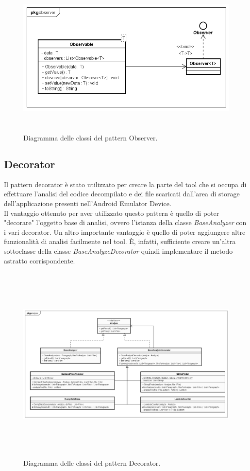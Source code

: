 \begin{figure}[H]
    \centering
    \includegraphics[width=14cm, height=8cm]{./immagini/diagrammi_uml/Observer.png}
    \caption{Diagramma delle classi del pattern Observer.}\label{fig:observer}
\end{figure}

\newpage
\subsection{Decorator}\label{subsec:decorator}
Il pattern decorator\cite{womak:decorator} è stato utilizzato per creare la parte del tool che si occupa
di effettuare l'analisi del codice decompilato e dei file scaricati dall'area di storage
dell'applicazione presenti nell'Android Emulator Device.\\
Il vantaggio ottenuto per aver utilizzato questo pattern è quello di poter "decorare" l'oggetto base di analisi, ovvero l'istanza della classe \textit{BaseAnalyzer} con i vari decorator.
Un altro importante vantaggio è quello di poter aggiungere altre funzionalità
di analisi facilmente nel tool.
È, infatti, sufficiente creare un'altra sottoclasse della classe \textit{BaseAnalyzeDecorator} quindi implementare il metodo astratto corrispondente.

\begin{figure}[H]
    \centering
    \includegraphics[width=14cm, height=10cm]{./immagini/diagrammi_uml/Decorator.png}
    \caption{Diagramma delle classi del pattern Decorator.}\label{fig:decorator}
\end{figure}

